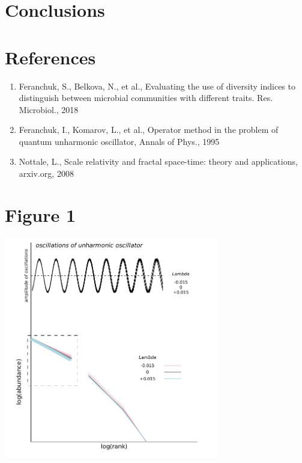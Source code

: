 \documentclass[a4paper]{article}
\begin{document}
\section*{Conclusions}




\section{References}

\begin{enumerate}

\item Feranchuk, S., Belkova, N., et al., Evaluating the use of diversity indices to distinguish between microbial communities with different traits. Res. Microbiol., 2018

\item Feranchuk, I., Komarov, L., et al., Operator method in the problem of quantum unharmonic oscillator, Annals of Phys., 1995 

\item Nottale, L., Scale relativity and fractal space-time: theory and applications, arxiv.org, 2008

\end{enumerate}

\newpage
\section*{Figure 1}

\includegraphics[width=0.7\textwidth]{rankabundance_unharmonic.jpg}
\end{document}
